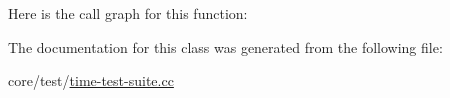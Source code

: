 Here is the call graph for this function\+:




The documentation for this class was generated from the following file\+:\begin{DoxyCompactItemize}
\item 
core/test/\hyperlink{time-test-suite_8cc}{time-\/test-\/suite.\+cc}\end{DoxyCompactItemize}
